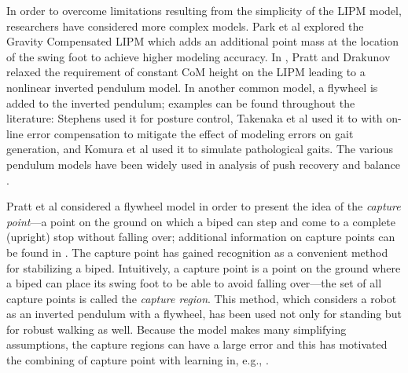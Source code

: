 In order to overcome limitations resulting from the simplicity of the LIPM
model, researchers have considered more complex models.
%
Park et al \cite{Park1998} explored the Gravity Compensated LIPM which adds an
additional point mass at the location of the swing foot to achieve higher
modeling accuracy.
%
In \cite{Pratt2007}, Pratt and Drakunov relaxed the requirement of constant CoM
height on the LIPM leading to a nonlinear inverted pendulum model.
%
In another common model, a flywheel is added to the inverted pendulum;
%
examples can be found throughout the literature:
%
Stephens \cite{Stephens2011} used it for posture control,
%
Takenaka et al \cite{Takenaka2009} used it to with on-line error compensation to
mitigate the effect of modeling errors on gait generation,
%
and Komura et al \cite{Komura2005} used it to simulate pathological gaits.
%
The various pendulum models have been widely used in analysis of push recovery
and balance \cite{Takanishi1990, Hof2005, Hyon2007, Stephens2007}.


%
Pratt et al \cite{Pratt2006} considered a flywheel model in order to present the
idea of the {\em capture point}---a point on the ground on which a biped can
step and come to a complete (upright) stop without falling over;
%
additional information on capture points can be found in \cite{Koolen2012,
  Pratt2012}.
%
The capture point \cite{Pratt2006a} has gained recognition as a convenient
method for stabilizing a biped.
%
Intuitively, a capture point is a point on the ground where a biped can place
its swing foot to be able to avoid falling over---the set of all capture points
is called the {\em capture region}.
%
This method, which considers a robot as an inverted pendulum with a flywheel,
has been used not only for standing but for robust walking as well.
%
Because the model makes many simplifying assumptions, the capture regions can
have a large error and this has motivated the combining of capture point with
learning in, e.g., \cite{Rebula2007}.


